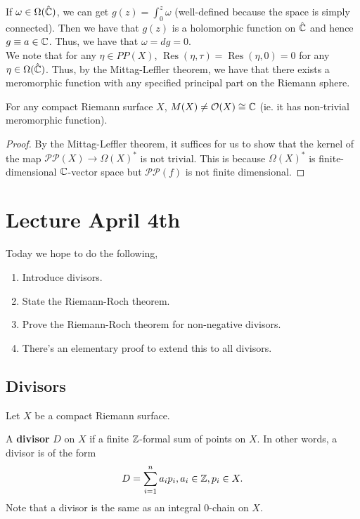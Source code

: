 \documentclass{article}
\begin{document}
{\begin{example}
    If $\omega \in \Omega(\hat{\mathbb{C}})$, we can get $g(z) = \int_0^z \omega$ (well-defined because the space is simply connected). Then we have that $g(z)$ is a holomorphic function on $\hat{\mathbb{C}}$ and hence $g \equiv a \in \mathbb{C}$. Thus, we have that $\omega = dg = 0$.\\

    We note that for any $\eta \in PP(X)$, $\operatorname{Res}(\eta, \tau) = \operatorname{Res}(\eta, 0) = 0$ for any $\eta \in \Omega(\hat{\mathbb{C}})$. Thus, by the Mittag-Leffler theorem, we have that there exists a meromorphic function with any specified principal part on the Riemann sphere.
\end{example}

\begin{theorem}
    For any compact Riemann surface $X$, $M(X) \neq \mathcal{O}(X) \cong \mathbb{C}$ (ie. it has non-trivial meromorphic function).
\end{theorem}

\begin{proof}
    By the Mittag-Leffler theorem, it suffices for us to show that the kernel of the map $\mathcal{P} \mathcal{P}(X) \to \Omega(X)^*$ is not trivial. This is because $\Omega(X)^*$ is finite-dimensional $\mathbb{C}$-vector space but $\mathcal{P} \mathcal{P}(f)$ is not finite dimensional.
\end{proof}

\newpage
\section{Lecture April 4th}

Today we hope to do the following,
\begin{enumerate}
    \item Introduce divisors.
    \item State the Riemann-Roch theorem.
    \item Prove the Riemann-Roch theorem for non-negative divisors.
    \item There's an elementary proof to extend this to all divisors.
\end{enumerate}

\subsection{Divisors}

Let $X$ be a compact Riemann surface.
\begin{definition}
    A \textbf{divisor} $D$ on $X$ if a finite $\mathbb{Z}$-formal sum of points on $X$. In other words, a divisor is of the form
    \[D = \sum_{i = 1}^n a_i p_i, a_i \in \mathbb{Z}, p_i \in X.\]
    Note that a divisor is the same as an integral $0$-chain on $X$.
\end{definition}

}
\end{document}
